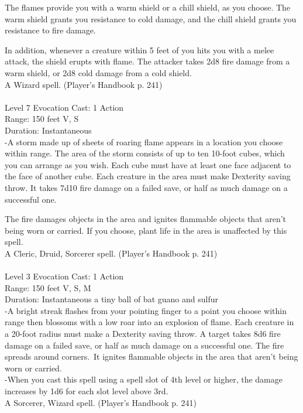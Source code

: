 \documentclass[10pt,twocolumn]{report}
\begin{document}
The flames provide you with a warm shield or a chill shield, as you choose. The warm shield grants you resistance to cold damage, and the chill shield grants you resistance to fire damage.

In addition, whenever a creature within 5 feet of you hits you with a melee attack, the shield erupts with flame. The attacker takes 2d8 fire damage from a warm shield, or 2d8 cold damage from a cold shield.\\
A Wizard spell. (Player's Handbook p. 241) \\


 \\
Level 7 \quad Evocation \quad Cast: 1 Action\\
Range: 150 feet \quad V, S\\
Duration: Instantaneous \quad \\
-A storm made up of sheets of roaring flame appears in a location you choose within range. 
The area of the storm consists of up to ten 10-foot cubes, which you can arrange as you wish. Each cube must have at least one face adjacent to the face of another cube. Each creature in the area must make  Dexterity saving throw. It takes 7d10 fire damage on a failed save, or half as much damage on a successful one.

The fire damages objects in the area and ignites flammable objects that aren’t being worn or carried. If you choose, plant life in the area is unaffected by this spell.\\
A Cleric, Druid, Sorcerer spell. (Player's Handbook p. 241) \\


 \\
Level 3 \quad Evocation \quad Cast: 1 Action\\
Range: 150 feet \quad V, S, M\\
Duration: Instantaneous \quad a tiny ball of bat guano and sulfur\\
-A bright streak flashes from your pointing finger to a point you choose within range then blossoms with a low roar into an explosion of flame.
Each creature in a 20-foot radius must make a Dexterity saving throw. A target takes 8d6 fire damage on a failed save, or half as much damage on a successful one. The fire spreads around corners. It ignites flammable objects in the area that aren’t being worn or carried.\\
-When you cast this spell using a spell slot of 4th level or higher, the damage increases by 1d6 for each slot level above 3rd.\\
A Sorcerer, Wizard spell. (Player's Handbook p. 241) \\
\end{document}
